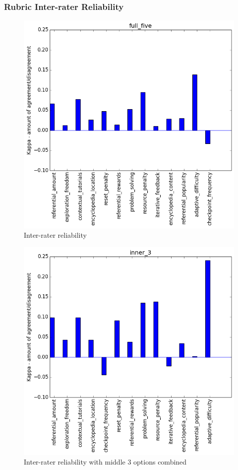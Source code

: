 		\subsubsection{Rubric Inter-rater Reliability}
			\begin{figure}[h] 
				\centering 
				\includegraphics[width=\textwidth]{full_five_stats.png} 
				\caption{Inter-rater reliability}
			\end{figure}
			\begin{figure}[h] 
				\centering 
				\includegraphics[width=\textwidth]{inner_3_stats.png} 
				\caption{Inter-rater reliability with middle 3 options combined}
			\end{figure}
